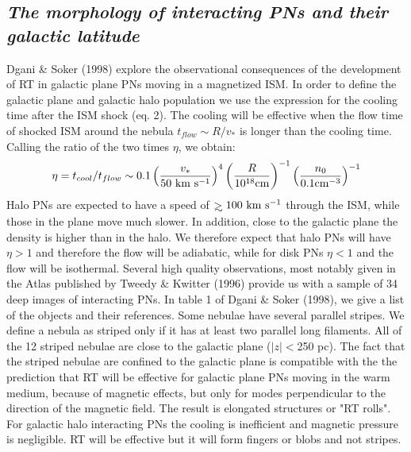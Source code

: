 \subsection{\it The morphology of interacting PNs and their galactic latitude}
Dgani \& Soker (1998) explore the observational consequences of the development
of RT in galactic plane PNs moving in a magnetized ISM.
In order to define the galactic plane and galactic halo population we
use the expression for the cooling time after the ISM shock (eq. 2).
The cooling will be effective when the flow time of shocked ISM around
the nebula $t_{flow}\sim R/v_*$ is longer than the cooling time.
Calling the ratio of the two times $\eta$, we obtain:
\begin{eqnarray}
\eta=t_{cool}/t_{flow} \sim 0.1
\left( {{v_\ast}\over{50 ~\rm{km} ~\rm{s}^{-1}}} \right)^4
\left( {{R}\over{10^{18} \rm{cm}}} \right) ^{-1}
\left( {{n_0}\over{0.1 \rm{cm}^{-3}}} \right) ^{-1}
\end{eqnarray}
Halo PNs are expected to have a speed of $\mathrel{>\kern-1.0em\lower0.9ex\hbox{$\sim$}} 100 ~\rm{km} ~\rm{s}^{-1}$ through
the ISM, while those in the plane move much slower.
In addition, close to the galactic plane the density is higher
than in the halo.
We therefore expect that halo PNs will have $\eta > 1$ and therefore
the flow will be adiabatic, while for disk PNs
$\eta < 1$ and the flow will be isothermal.
Several high quality observations,
most notably given in the Atlas published by Tweedy \& Kwitter (1996)
provide us with a sample of 34 deep images of interacting PNs.
In table 1 of Dgani \& Soker (1998),
we give a list of the objects and their references.
Some nebulae
have several parallel stripes.
We define a nebula as striped only
if it has at least two parallel long filaments.
All of the 12 striped nebulae are close to the galactic plane ($|z|<$250 pc).
The fact that the striped nebulae are confined to the galactic plane
is compatible with the the prediction
that RT will be effective for
galactic plane PNs moving in the warm medium, because of
magnetic effects, but only for modes perpendicular
to the direction of the magnetic field.
The result is elongated structures or "RT rolls".
For galactic halo interacting PNs the cooling is
inefficient and magnetic pressure is negligible.
RT will be effective but it will form fingers or blobs and not stripes.

